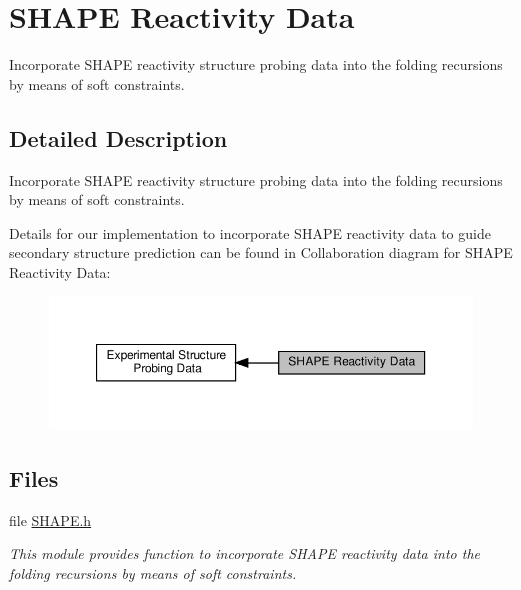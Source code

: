\hypertarget{group__SHAPE__reactivities}{}\section{S\+H\+A\+PE Reactivity Data}
\label{group__SHAPE__reactivities}


Incorporate S\+H\+A\+PE reactivity structure probing data into the folding recursions by means of soft constraints.  




\subsection{Detailed Description}
Incorporate S\+H\+A\+PE reactivity structure probing data into the folding recursions by means of soft constraints. 

Details for our implementation to incorporate S\+H\+A\+PE reactivity data to guide secondary structure prediction can be found in \cite{lorenz:2016a} Collaboration diagram for S\+H\+A\+PE Reactivity Data\+:
\nopagebreak
\begin{figure}[H]
\begin{center}
\leavevmode
\includegraphics[width=350pt]{group__SHAPE__reactivities}
\end{center}
\end{figure}
\subsection*{Files}
\begin{DoxyCompactItemize}
\item 
file \hyperlink{SHAPE_8h}{S\+H\+A\+P\+E.\+h}
\begin{DoxyCompactList}\small\item\em This module provides function to incorporate S\+H\+A\+PE reactivity data into the folding recursions by means of soft constraints. \end{DoxyCompactList}\end{DoxyCompactItemize}
